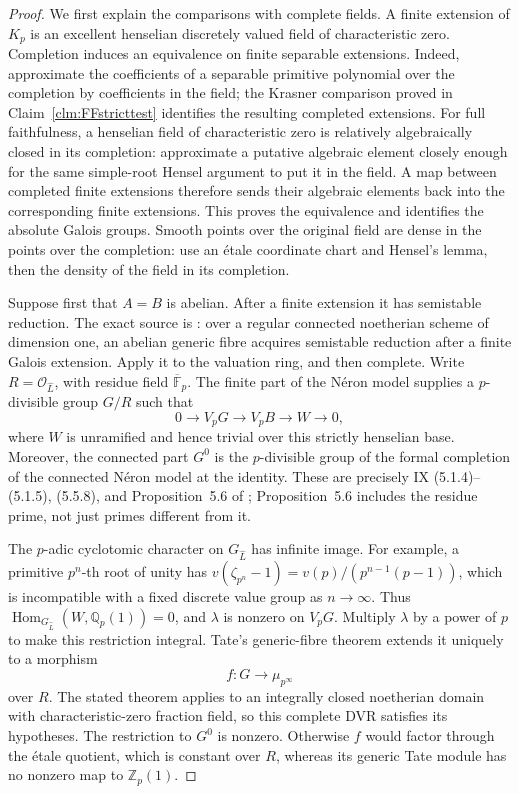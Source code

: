 \documentclass[11pt]{article}
\begin{document}
\begin{proof}
We first explain the comparisons with complete fields.
A finite extension of \(K_p\) is an excellent henselian
discretely valued field of characteristic zero. Completion
induces an equivalence on finite separable extensions.
Indeed, approximate the coefficients of a separable primitive
polynomial over the completion by coefficients in the field;
the Krasner comparison proved in
Claim~\ref{clm:FFstricttest} identifies the resulting completed
extensions. For full faithfulness, a henselian field of
characteristic zero is relatively algebraically closed in its
completion: approximate a putative algebraic element closely
enough for the same simple-root Hensel argument to put it in
the field. A map between completed finite extensions therefore
sends their algebraic elements back into the corresponding
finite extensions. This proves the equivalence and identifies
the absolute Galois groups. Smooth points over the original
field are dense in the points over the completion: use an
\'etale coordinate chart and Hensel's lemma, then the density
of the field in its completion.

Suppose first that \(A=B\) is abelian. After a finite extension
it has semistable reduction. The exact source is
\citet[IX, Theorem~3.6]{FF_SGA7I1972}: over a regular connected
noetherian scheme of dimension one, an abelian generic fibre
acquires semistable reduction after a finite Galois extension.
Apply it to the valuation ring, and then complete. Write
\(R=\mathcal O_{\widehat L}\), with residue field
\(\overline{\mathbb F}_p\). The finite part of the N\'eron
model supplies a \(p\)-divisible group \(G/R\) such that
\[
 0\longrightarrow V_pG\longrightarrow V_pB
       \longrightarrow W\longrightarrow0,             \tag{F.25.2}
\]
where \(W\) is unramified and hence trivial over this
strictly henselian base. Moreover, the connected part
\(G^0\) is the \(p\)-divisible group of the formal
completion of the connected N\'eron model at the identity.
These are precisely
IX (5.1.4)--(5.1.5), (5.5.8), and Proposition~5.6 of
\cite{FF_SGA7I1972}; Proposition~5.6 includes the residue
prime, not just primes different from it.

The \(p\)-adic cyclotomic character on \(G_{\widehat L}\)
has infinite image. For example, a primitive
\(p^n\)-th root of unity has
\(v(\zeta_{p^n}-1)=v(p)/(p^{n-1}(p-1))\), which is
incompatible with a fixed discrete value group as
\(n\to\infty\). Thus
\(\operatorname{Hom}_{G_{\widehat L}}(W,\mathbb Q_p(1))=0\),
and \(\lambda\) is nonzero on \(V_pG\).
Multiply \(\lambda\) by a power of \(p\) to make this
restriction integral. Tate's generic-fibre theorem
\citep[Theorem~4 and Corollary~1]{FF_Tate1967} extends it
uniquely to a morphism
\[
                       f:G\longrightarrow\mu_{p^\infty}
\]
over \(R\). The stated theorem applies to an integrally
closed noetherian domain with characteristic-zero fraction
field, so this complete DVR satisfies its hypotheses.
The restriction to \(G^0\) is nonzero. Otherwise \(f\)
would factor through the \'etale quotient, which is constant
over \(R\), whereas its generic Tate module has no nonzero
map to \(\mathbb Z_p(1)\).


\end{proof}
\end{document}
